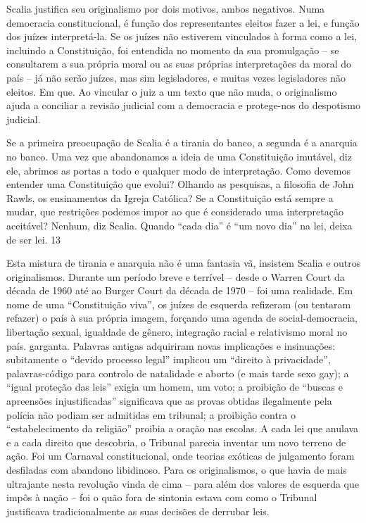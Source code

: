  
\par
 
Scalia justifica seu originalismo por dois motivos, ambos negativos. Numa democracia constitucional, é função dos representantes eleitos fazer a lei, e função dos juízes interpretá-la. Se os juízes não estiverem vinculados à forma como a lei, incluindo a Constituição, foi entendida no momento da sua promulgação – se consultarem a sua própria moral ou as suas próprias interpretações da moral do país – já não serão juízes, mas sim legisladores, e muitas vezes legisladores não eleitos. Em que. Ao vincular o juiz a um texto que não muda, o originalismo ajuda a conciliar a revisão judicial com a democracia e protege-nos do despotismo judicial.
 
\par
 
Se a primeira preocupação de Scalia é a tirania do banco, a segunda é a anarquia no banco. Uma vez que abandonamos a ideia de uma Constituição imutável, diz ele, abrimos as portas a todo e qualquer modo de interpretação. Como devemos entender uma Constituição que evolui? Olhando as pesquisas, a filosofia de John Rawls, os ensinamentos da Igreja Católica? Se a Constituição está sempre a mudar, que restrições podemos impor ao que é considerado uma interpretação aceitável? Nenhum, diz Scalia. Quando “cada dia” é “um novo dia” na lei, deixa de ser lei.
 {\color{blue} 13}  

 
\par
 
Esta mistura de tirania e anarquia não é uma fantasia vã, insistem Scalia e outros originalismos. Durante um período breve e terrível – desde o Warren Court da década de 1960 até ao Burger Court da década de 1970 – foi uma realidade. Em nome de uma “Constituição viva”, os juízes de esquerda refizeram (ou tentaram refazer) o país à sua própria imagem, forçando uma agenda de social-democracia, libertação sexual, igualdade de gênero, integração racial e relativismo moral no país. garganta. Palavras antigas adquiriram novas implicações e insinuações: subitamente o “devido processo legal” implicou um “direito à privacidade”, palavras-código para controlo de natalidade e aborto (e mais tarde sexo gay); a “igual proteção das leis” exigia um homem, um voto; a proibição de “buscas e apreensões injustificadas” significava que as provas obtidas ilegalmente pela polícia não podiam ser admitidas em tribunal; a proibição contra o “estabelecimento da religião” proibia a oração nas escolas. A cada lei que anulava e a cada direito que descobria, o Tribunal parecia inventar um novo terreno de ação. Foi um Carnaval constitucional, onde teorias exóticas de julgamento foram desfiladas com abandono libidinoso. Para os originalismos, o que havia de mais ultrajante nesta revolução vinda de cima – para além dos valores de esquerda que impôs à nação – foi o quão fora de sintonia estava com como o Tribunal justificava tradicionalmente as suas decisões de derrubar leis.
 
